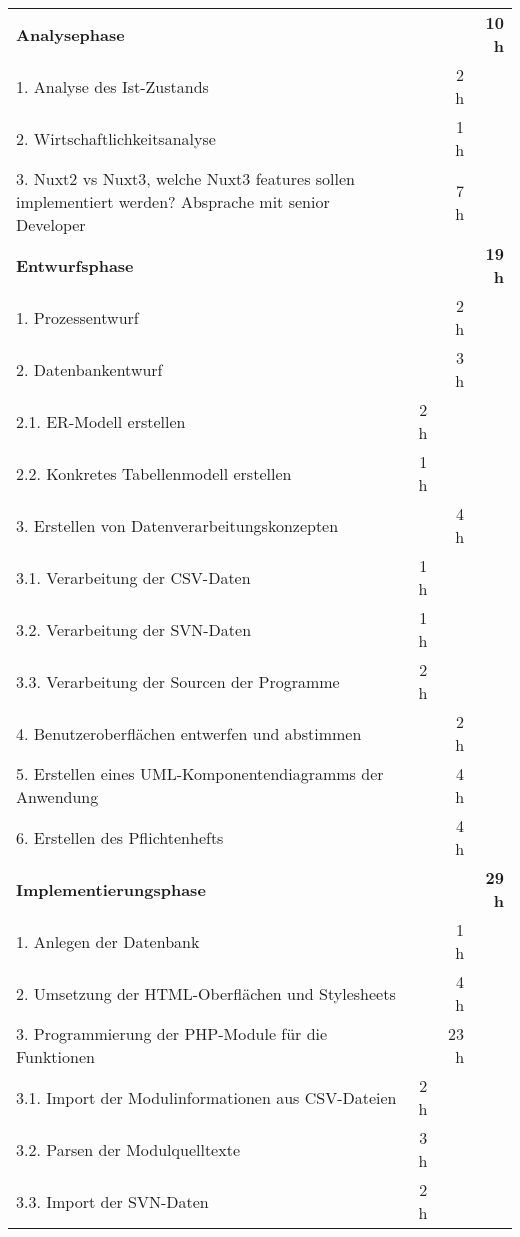\begin{tabularx}{\textwidth}{Xrrr}
\rowcolor{heading}\textbf{Analysephase} & \textbf{} & \textbf{} & \textbf{10 h} \\
1. Analyse des Ist-Zustands &       & 2 h   &  \\
\rowcolor{odd}2. Wirtschaftlichkeitsanalyse &       & 1 h   &  \\
3. Nuxt2 vs Nuxt3, welche Nuxt3 features sollen implementiert werden? Absprache mit senior Developer &       & 7 h   &  \\
\rowcolor{heading}\textbf{Entwurfsphase} & \textbf{} & \textbf{} & \textbf{19 h} \\
1. Prozessentwurf &       & 2 h   &  \\
\rowcolor{odd}2. Datenbankentwurf &       & 3 h   &  \\
2.1. ER-Modell erstellen & 2 h   &       &  \\
\rowcolor{odd}2.2. Konkretes Tabellenmodell erstellen & 1 h   &       &  \\
3. Erstellen von Datenverarbeitungskonzepten &       & 4 h   &  \\
\rowcolor{odd}3.1. Verarbeitung der CSV-Daten & 1 h   &       &  \\
3.2. Verarbeitung der SVN-Daten & 1 h   &       &  \\
\rowcolor{odd}3.3. Verarbeitung der Sourcen der Programme & 2 h   &       &  \\
4. Benutzeroberflächen entwerfen und abstimmen &       & 2 h   &  \\
\rowcolor{odd}5. Erstellen eines UML-Komponentendiagramms der Anwendung &       & 4 h   &  \\
6. Erstellen des Pflichtenhefts &       & 4 h   &  \\
\rowcolor{heading}\textbf{Implementierungsphase} & \textbf{} & \textbf{} & \textbf{29 h} \\
1. Anlegen der Datenbank &       & 1 h   &  \\
\rowcolor{odd}2. Umsetzung der HTML-Oberflächen und Stylesheets &       & 4 h   &  \\
3. Programmierung der PHP-Module für die Funktionen &       & 23 h  &  \\
\rowcolor{odd}3.1. Import der Modulinformationen aus CSV-Dateien & 2 h   &       &  \\
3.2. Parsen der Modulquelltexte & 3 h   &       &  \\
\rowcolor{odd}3.3. Import der SVN-Daten & 2 h   &       &  \\

\end{tabularx}

